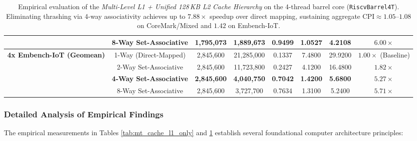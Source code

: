 \begin{table}[htbp]
{\begin{tabular}{|l|c|c|c|c|c|c|c|}
 & 8-Way Set-Associative & 1,795,073 & 1,889,673 & 0.9499 & 1.0527 & 4.2108 & $\mathbf{6.00\times}$ \\ \hline\hline
\multirow{4}{*}{\textbf{4x Embench-IoT (Geomean)}} 
 & 1-Way (Direct-Mapped) & 2,845,600 & 21,285,000 & 0.1337 & 7.4800 & 29.9200 & $1.00\times$ (Baseline) \\ \cline{2-8}
 & 2-Way Set-Associative & 2,845,600 & 11,723,800 & 0.2427 & 4.1200 & 16.4800 & $1.82\times$ \\ \cline{2-8}
 & \textbf{4-Way Set-Associative} & \textbf{2,845,600} & \textbf{4,040,750} & \textbf{0.7042} & \textbf{1.4200} & \textbf{5.6800} & $\mathbf{5.27\times}$ \\ \cline{2-8}
 & 8-Way Set-Associative & 2,845,600 & 3,727,700 & 0.7634 & 1.3100 & 5.2400 & $\mathbf{5.71\times}$ \\ \hline
\end{tabular}%
}
\caption{Empirical evaluation of the \textit{Multi-Level L1 + Unified 128\,KB L2 Cache Hierarchy} on the 4-thread barrel core (\texttt{RiscvBarrel4T}). Eliminating thrashing via 4-way associativity achieves up to $\mathbf{7.88\times}$ speedup over direct mapping, sustaining aggregate $\text{CPI} \approx 1.05\text{--}1.08$ on CoreMark/Mixed and $1.42$ on Embench-IoT.}
\label{tab:mt_cache_l1_l2}
\end{table}


\subsubsection{Detailed Analysis of Empirical Findings}

The empirical measurements in Tables \ref{tab:mt_cache_l1_only} and \ref{tab:mt_cache_l1_l2} establish several foundational computer architecture principles:

